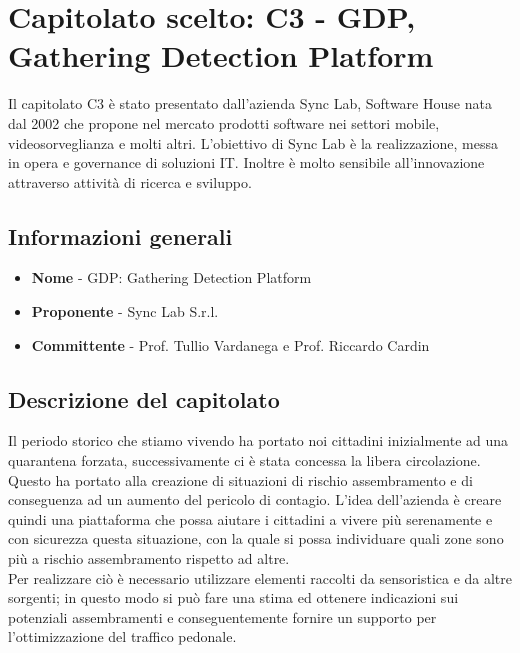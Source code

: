 \chapter{Capitolato scelto: C3 - GDP, Gathering Detection Platform}

Il capitolato C3 è stato presentato dall'azienda Sync Lab, Software House  nata dal 2002 che propone nel mercato prodotti software nei settori mobile, videosorveglianza e molti altri. L’obiettivo di Sync Lab è la realizzazione, messa in opera e governance di soluzioni IT. Inoltre è molto sensibile all'innovazione attraverso attività di ricerca  e sviluppo.

\section{Informazioni generali}
\begin{itemize}
	\item \textbf{Nome} - GDP: Gathering Detection Platform
	\item \textbf{Proponente} - Sync Lab S.r.l.
	\item \textbf{Committente} - Prof. Tullio Vardanega e Prof. Riccardo Cardin
\end{itemize}
\section{Descrizione del capitolato}
Il periodo storico che stiamo vivendo ha portato noi cittadini inizialmente ad una quarantena forzata, successivamente ci è stata concessa la libera circolazione. Questo ha portato alla creazione di situazioni di rischio assembramento e di conseguenza ad un aumento del  pericolo di contagio. L'idea dell'azienda è creare quindi una piattaforma che possa aiutare i cittadini a vivere più serenamente e con sicurezza questa situazione, con la quale si possa individuare quali zone sono più a rischio assembramento rispetto ad altre. \\
Per realizzare ciò è necessario utilizzare elementi raccolti da sensoristica e da altre sorgenti; in questo modo si può fare una stima ed ottenere indicazioni sui potenziali assembramenti e conseguentemente fornire un supporto per l'ottimizzazione del traffico pedonale.
